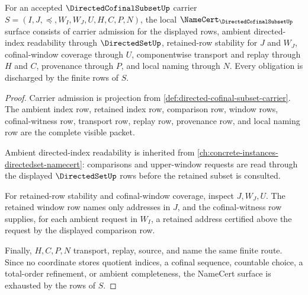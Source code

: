 \begin{theorem}
\label{thm:directed-cofinal-subset-namecert-obligations}
For an accepted $\DirectedCofinalSubsetUp$ carrier $S=(I,J,\preceq,W_I,W_J,U,H,C,P,N)$, the local $\NameCert_{\DirectedCofinalSubsetUp}$ surface consists of carrier admission for the displayed rows, ambient directed-index readability through $\DirectedSetUp$, retained-row stability for $J$ and $W_J$, cofinal-window coverage through $U$, componentwise transport and replay through $H$ and $C$, provenance through $P$, and local naming through $N$. Every obligation is discharged by the finite rows of $S$.
\end{theorem}
\begin{proof}
Carrier admission is projection from \autoref{def:directed-cofinal-subset-carrier}. The ambient index row, retained index row, comparison row, window rows, cofinal-witness row, transport row, replay row, provenance row, and local naming row are the complete visible packet.

Ambient directed-index readability is inherited from \autoref{ch:concrete-instances-directedset-namecert}: comparisons and upper-window requests are read through the displayed $\DirectedSetUp$ rows before the retained subset is consulted.

For retained-row stability and cofinal-window coverage, inspect $J,W_J,U$. The retained window row names only addresses in $J$, and the cofinal-witness row supplies, for each ambient request in $W_I$, a retained address certified above the request by the displayed comparison row.

Finally, $H,C,P,N$ transport, replay, source, and name the same finite route. Since no coordinate stores quotient indices, a cofinal sequence, countable choice, a total-order refinement, or ambient completeness, the NameCert surface is exhausted by the rows of $S$.
\end{proof}

